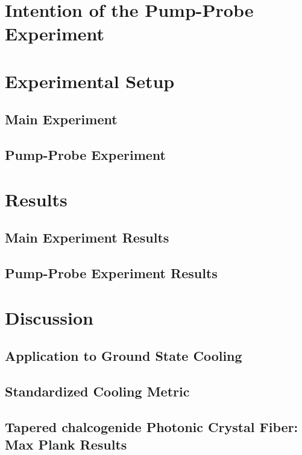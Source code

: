 
\section{Intention of the Pump-Probe Experiment}
\label{sec:Cooling:Intention}


\section{Experimental Setup}
\label{sec:Cooling:Setup}


\subsection{Main Experiment}
\label{subsec:Cooling:Setup:Main}


\subsection{Pump-Probe Experiment}
\label{subsec:Cooling:Setup:Pump-Probe}


\section{Results}
\label{sec:Cooling:Results}


\subsection{Main Experiment Results}
\label{subsec:Cooling:Results:Main}


\subsection{Pump-Probe Experiment Results}
\label{subsec:Cooling:Results:Pump-Probe}


\section{Discussion}
\label{sec:Cooling:Discussion}


\subsection{Application to Ground State Cooling}
\label{subsec:Cooling:Discussion:Ground-State}


\subsection{Standardized Cooling Metric}
\label{subsec:Cooling:Discussion:Metric}


\subsection{Tapered chalcogenide Photonic Crystal Fiber: Max Plank Results}
\label{subsec:Cooling:Discussion:Max-Plank}
